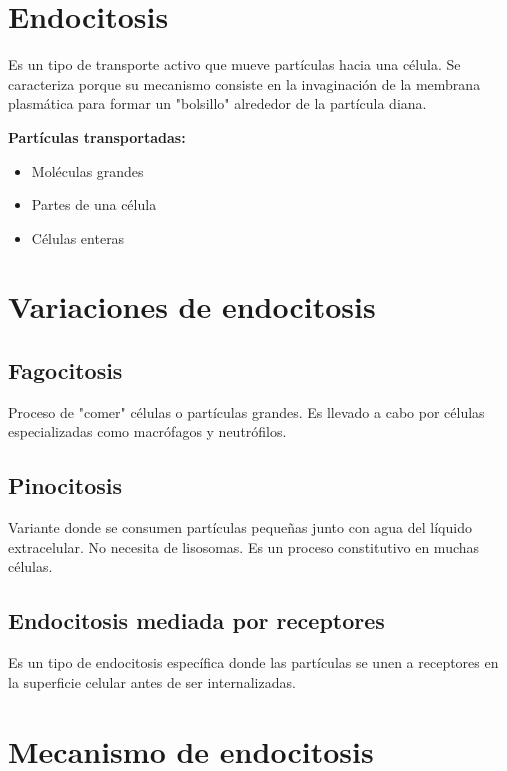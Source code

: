 \section{Endocitosis}

Es un tipo de transporte activo que mueve partículas hacia una célula. Se caracteriza porque su mecanismo consiste en la invaginación de la membrana plasmática para formar un "bolsillo" alrededor de la partícula diana.

\textbf{Partículas transportadas:}

\begin{itemize}
    \item Moléculas grandes
    \item Partes de una célula
    \item Células enteras
\end{itemize}

\section{Variaciones de endocitosis}

\subsection{Fagocitosis}
Proceso de "comer" células o partículas grandes. Es llevado a cabo por células especializadas como macrófagos y neutrófilos.

\subsection{Pinocitosis}
Variante donde se consumen partículas pequeñas junto con agua del líquido extracelular. No necesita de lisosomas. Es un proceso constitutivo en muchas células.

\subsection{Endocitosis mediada por receptores}
Es un tipo de endocitosis específica donde las partículas se unen a receptores en la superficie celular antes de ser internalizadas.

\section{Mecanismo de endocitosis}

